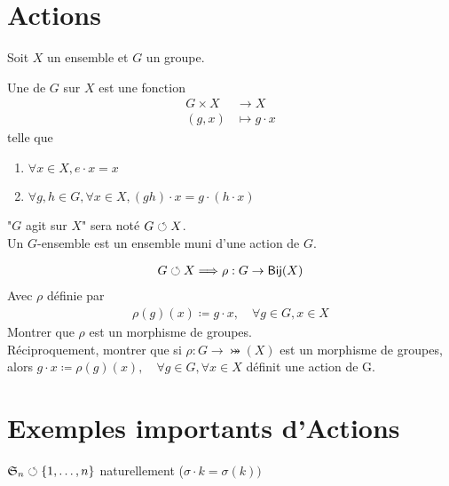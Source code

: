 \documentclass[french,a4paper,10pt]{article}
\begin{document}
	\section{Actions}
	
	Soit $X$ un ensemble et $G$ un groupe.
	
	
	
	\begin{definition}
		Une  de $G$ sur $X$ est une fonction
		\[\begin{aligned}
			G\times X &\to X\\
			(g,x)&\mapsto g\cdot x
		\end{aligned}\]
		telle que 
		\begin{enumerate}[label=$(\roman*)$]
			\item $\forall x\in X, e\cdot x = x$
			
			\item $\forall g,h\in G, \forall x\in X, (gh)\cdot x=g\cdot(h\cdot x)$
		\end{enumerate}
	\end{definition}
	
	
	
	\begin{remark}
		"$G$ agit sur $X$" sera noté $G\circlearrowleft X$.\\
		Un $G$-ensemble est un ensemble muni d'une action de $G$.
	\end{remark}
	
	
	\begin{exercice}
		\[\begin{aligned}
			G\circlearrowleft X\Longrightarrow \rho:G\to \operatorname{\mathsf{Bij}}(X)
		\end{aligned}\]
		Avec $\rho$ définie par 
		\[\begin{aligned}
			\rho(g)(x)\coloneq g\cdot x,\quad\forall g\in G, x\in X
		\end{aligned}\]
		Montrer que $\rho$ est un morphisme de groupes.\\
		
		Réciproquement, montrer que si $\rho\colon G\to \bij(X)$ est un morphisme de groupes, alors
		$g\cdot x\coloneq \rho(g)(x),\quad\forall g\in G, \forall x\in X$ définit une action de G.
	\end{exercice}
	
	\section{Exemples importants d'Actions}
	
	\begin{example}
		$\mathfrak S_n \circlearrowleft\{1, \dots, n\}$ naturellement ($\sigma\cdot k=\sigma(k))$
	\end{example}
	
\end{document}
